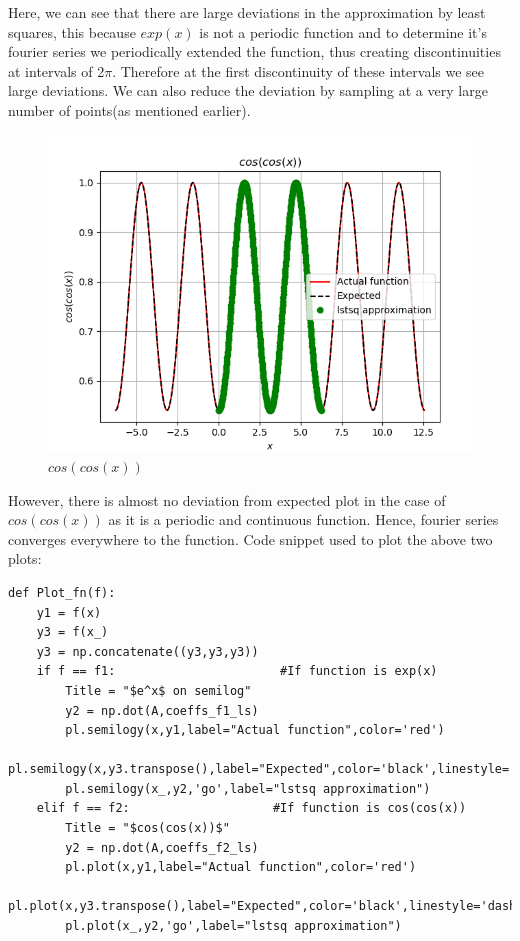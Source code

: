 \documentclass[11pt, a4paper]{article}
\begin{document}
    Here, we can see that there are large deviations in the approximation by least squares, this because $exp(x)$ is not a periodic function and to determine it's fourier series we periodically extended the function, thus creating discontinuities at intervals of 2$\pi$. Therefore at the first discontinuity of these intervals we see large deviations. We can also reduce the deviation by sampling at a very large number of points(as mentioned earlier).
    \begin{figure}[!h]
        \centering
        \includegraphics[scale = 0.8]{Figure 2.png}
        \caption{$cos(cos(x))$}
        \label{fig:Figure 2}
    \end{figure}
    
    However, there is almost no deviation from expected plot in the case of $cos(cos(x))$ as it is a periodic and continuous function. Hence, fourier series converges everywhere to the function.
    Code snippet used to plot the above two plots:
    \begin{verbatim}
def Plot_fn(f):
    y1 = f(x)
    y3 = f(x_)
    y3 = np.concatenate((y3,y3,y3))
    if f == f1:                       #If function is exp(x)
        Title = "$e^x$ on semilog"
        y2 = np.dot(A,coeffs_f1_ls)                                              
        pl.semilogy(x,y1,label="Actual function",color='red')                    
        pl.semilogy(x,y3.transpose(),label="Expected",color='black',linestyle='dashed')
        pl.semilogy(x_,y2,'go',label="lstsq approximation")                      
    elif f == f2:                    #If function is cos(cos(x))
        Title = "$cos(cos(x))$"
        y2 = np.dot(A,coeffs_f2_ls)                                              
        pl.plot(x,y1,label="Actual function",color='red')                        
        pl.plot(x,y3.transpose(),label="Expected",color='black',linestyle='dashed')
        pl.plot(x_,y2,'go',label="lstsq approximation")      
    \end{verbatim}
\end{document}
